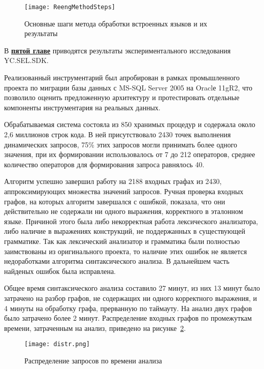 \begin{figure}[H]
\begin{center}
\texttt{[image: ReengMethodSteps]}
\caption{Основные шаги метода обработки встроенных языков и их результаты}
\label{fig:method} 
\end{center}
\end{figure}


В \underline{\textbf{пятой главе}} приводятся результаты экспериментального исследования YC.SEL.SDK.

Реализованный инструментарий был апробирован в рамках промышленного проекта по миграции базы данных с MS-SQL Server 2005 на Oraclе 11gR2, что позволило оценить предложенную архитектуру и протестировать отдельные компоненты инструментария на реальных данных.

Обрабатываемая система состояла из 850 хранимых процедур и содержала около 2,6 миллионов строк кода. В ней присутствовало 2430 точек выполнения динамических запросов, 75\% этих запросов могли принимать 
более одного значения, при их формировании использовалось от 7 до 212 операторов, среднее количество операторов для формирования запроса равнялось 40.

Алгоритм успешно завершил работу на 2188 входных графах из 2430, аппроксимирующих множества значений запросов. Ручная проверка входных графов, на которых алгоритм завершался с ошибкой, показала, что они действительно не содержали ни одного выражения, корректного в эталонном языке. Причиной этого была либо некорректная работа лексического анализатора, либо наличие в выражениях конструкций, не поддержанных в существующей грамматике. Так как лексический анализатор и грамматика были полностью заимствованы из оригинального проекта, то наличие этих ошибок не является недоработками алгоритма синтаксического анализа. В дальнейшем часть найденых ошибок была исправлена.

Общее время синтаксического анализа составило 27 минут, из них 13 минут было затрачено на разбор графов, не содержащих ни одного корректного выражения, и 4 минуты на обработку графа, прерванную по таймауту. На анализ двух графов было затрачено более 2 минут. Распределение входных графов по промежуткам времени, затраченным на анализ, приведено на рисунке~\ref{distr}.

\begin{figure}[H]
  \centering
 \texttt{[image: distr.png]}
 \caption{Распределение запросов по времени анализа}
 \label{distr}
\end{figure}


